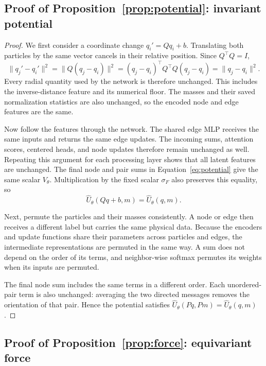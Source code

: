 \documentclass[10pt,letterpaper,twocolumn]{article}
\newcommand{\Uhat}{\widehat U}
\newcommand{\norm}[1]{\lVert #1\rVert}
\numberwithin{equation}{section}
\begin{document}
\subsection{Proof of Proposition~\ref{prop:potential}: invariant potential}
\label{proof:potential}

\begin{proof}
We first consider a coordinate change $q_i'=Qq_i+b$. Translating both particles by the same vector
cancels in their relative position. Since $Q^\top Q=I$,
\[
\norm{q_j'-q_i'}^2
=\norm{Q(q_j-q_i)}^2
=(q_j-q_i)^\top Q^\top Q(q_j-q_i)
=\norm{q_j-q_i}^2.
\]
Every radial quantity used by the network is therefore unchanged. This includes the inverse-distance
feature and its numerical floor. The masses and their saved normalization statistics are also
unchanged, so the encoded node and edge features are the same.

Now follow the features through the network. The shared edge MLP receives the same inputs and
returns the same edge updates. The incoming sums, attention scores, centered heads, and node
updates therefore remain unchanged as well. Repeating this argument for each processing layer
shows that all latent features are unchanged. The final node and pair sums in
Equation~\eqref{eq:potential} give the same scalar $V_\theta$. Multiplication by the fixed scalar
$\sigma_F$ also preserves this equality, so
\[
\Uhat_\theta(Qq+b,m)=\Uhat_\theta(q,m).
\]

Next, permute the particles and their masses consistently. A node or edge then receives a different
label but carries the same physical data. Because the encoders and update functions share their
parameters across particles and edges, the intermediate representations are permuted in the same
way. A sum does not depend on the order of its terms, and neighbor-wise softmax permutes its
weights when its inputs are permuted.

The final node sum includes the same terms in a different order. Each unordered-pair term is also
unchanged: averaging the two directed messages removes the orientation of that pair. Hence the
potential satisfies $\Uhat_\theta(Pq,Pm)=\Uhat_\theta(q,m)$.
\end{proof}

\subsection{Proof of Proposition~\ref{prop:force}: equivariant force}
\label{proof:force}
\end{document}
